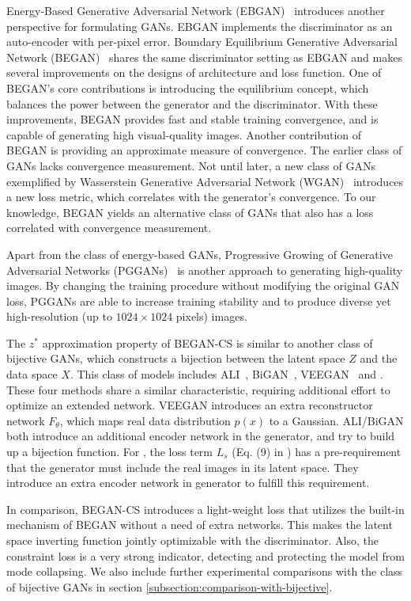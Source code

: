\documentclass[runningheads]{llncs}
\begin{document}
    Energy-Based Generative Adversarial Network (EBGAN)~\cite{EBGAN} introduces another perspective for formulating GANs. EBGAN implements the discriminator as an auto-encoder with per-pixel error. Boundary Equilibrium Generative Adversarial Network (BEGAN)~\cite{BEGAN} shares the same discriminator setting as EBGAN and makes several improvements on the designs of architecture and loss function. One of BEGAN's core contributions is introducing the equilibrium concept, which balances the power between the generator and the discriminator. With these improvements, BEGAN provides fast and stable training convergence, and is capable of generating high visual-quality images. Another contribution of BEGAN is providing an approximate measure of convergence. The earlier class of GANs lacks convergence measurement. Not until later, a new class of GANs exemplified by Wasserstein Generative Adversarial Network (WGAN)~\cite{WGAN} introduces a new loss metric, which correlates with the generator’s convergence. To our knowledge, BEGAN yields an alternative class of GANs that also has a loss correlated with convergence measurement.

    Apart from the class of energy-based GANs, Progressive Growing of Generative Adversarial Networks (PGGANs)~\cite{PGGAN} is another approach to generating high-quality images. By changing the training procedure without modifying the original GAN loss, PGGANs are able to increase training stability and to produce diverse yet high-resolution (up to $1024 \times 1024$ pixels) images.
    
    
    The $z^*$ approximation property of BEGAN-CS is similar to another class of bijective GANs, which constructs a bijection between the latent space $Z$ and the data space $X$. This class of models includes ALI~\cite{DumoulinBPLAMC16}, BiGAN~\cite{DonahueKD16}, VEEGAN~\cite{SrivastavaVRGS17} and \cite{reviewer_paper_A}. These four methods share a similar characteristic, requiring additional effort to optimize an extended network. VEEGAN introduces an extra reconstructor network $F_{\theta}$, which maps real data distribution $p(x)$ to a Gaussian. ALI/BiGAN both introduce an additional encoder network in the generator, and try to build up a bijection function. For \cite{reviewer_paper_A}, the loss term $L_s$ (Eq. (9) in \cite{reviewer_paper_A}) has a pre-requirement that the generator must include the real images in its latent space. They introduce an extra encoder network in generator to fulfill this requirement.
    
    
    In comparison, BEGAN-CS introduces a light-weight loss that utilizes the built-in mechanism of BEGAN without a need of extra networks. This makes the latent space inverting function jointly optimizable with the discriminator. Also, the constraint loss is a very strong indicator, detecting and protecting the model from mode collapsing. We also include further experimental comparisons with the class of bijective GANs in section \ref{subsection:comparison-with-bijective}.
    
\end{document}
